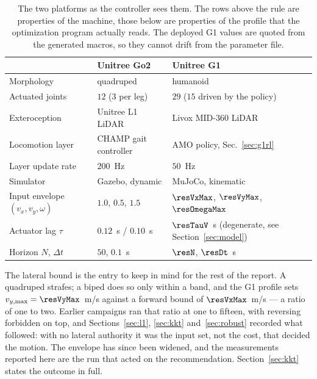 \documentclass[11pt,a4paper]{article}
\begin{document}
\begin{table}[htbp]
  \centering
  \small
  \caption{The two platforms as the controller sees them. The rows above the rule are properties of the
  machine, those below are properties of the profile that the optimization program actually reads. The
  deployed G1 values are quoted from the generated macros, so they cannot drift from the parameter file.}
  \label{tab:platforms}
  \begin{tabular}{lll}
    \toprule
                                & Unitree Go2                      & Unitree G1 \\
    \midrule
    Morphology                  & quadruped                        & humanoid \\
    Actuated joints             & $12$ ($3$ per leg)               & $29$ ($15$ driven by the policy) \\
    Exteroception               & Unitree L1 LiDAR                 & Livox MID-360 LiDAR \\
    \midrule
    Locomotion layer            & CHAMP gait controller            & AMO policy, Sec.~\ref{sec:g1rl} \\
    Layer update rate           & $200$~Hz                         & $50$~Hz \\
    Simulator                   & Gazebo, dynamic                  & MuJoCo, kinematic \\
    \midrule
    Input envelope $(v_x,v_y,\omega)$
                                & $1.0$, $0.5$, $1.5$              & $\resVxMax$, $\resVyMax$, $\resOmegaMax$ \\
    Actuator lag $\tau$         & $0.12$~s / $0.10$~s              & $\resTauV$~s (degenerate, see
                                                                     Section~\ref{sec:model}) \\
    Horizon $N$, $\Delta t$     & $50$, $0.1$~s                    & $\resN$, $\resDt$~s \\
    \bottomrule
  \end{tabular}
\end{table}

The lateral bound is the entry to keep in mind for the rest of the report. A quadruped strafes; a biped does
so only within a band, and the G1 profile sets $v_{y,\max}=\resVyMax$~m/s against a forward bound of
$\resVxMax$~m/s --- a ratio of one to two. Earlier campaigns ran that ratio at one to fifteen, with
reversing forbidden on top, and Sections~\ref{sec:l1}, \ref{sec:kkt} and~\ref{sec:robust} recorded what
followed: with no lateral authority it was the input set, not the cost, that decided the motion. The
envelope has since been widened, and the measurements reported here are the run that acted on the
recommendation. Section~\ref{sec:kkt} states the outcome in full.
\end{document}
